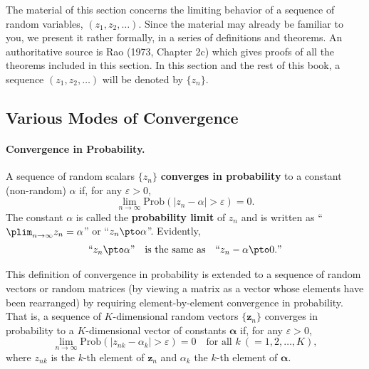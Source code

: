
The material of this section concerns the limiting behavior of a sequence of random
variables, $(z_1, z_2, \ldots)$.  Since the material may already be familiar to you, we
present it rather formally, in a series of definitions and theorems.  An authoritative
source is Rao (1973, Chapter 2c) which gives proofs of all the theorems included
in this section.  In this section and the rest of this book, a sequence $(z_1, z_2, \ldots)$
will be denoted by $\{z_n\}$.

\subsection*{Various Modes of Convergence}

\paragraph{Convergence in Probability.}
A sequence of random scalars $\{z_n\}$ \textbf{converges in probability} to a constant
(non-random) $\alpha$ if, for any $\varepsilon > 0$,
\begin{equation}
  \lim_{n \to \infty} \mathrm{Prob}(|z_n - \alpha| > \varepsilon) = 0.
  \label{eq:2.1.1}
\end{equation}
The constant $\alpha$ is called the \textbf{probability limit} of $z_n$ and is written as
``$\plim_{n \to \infty} z_n = \alpha$'' or ``$z_n \pto \alpha$''.  Evidently,
\[
  \text{``}z_n \pto \alpha\text{''} \quad \text{is the same as} \quad
  \text{``}z_n - \alpha \pto 0.\text{''}
\]

This definition of convergence in probability is extended to a sequence of random
vectors or random matrices (by viewing a matrix as a vector whose elements have
been rearranged) by requiring element-by-element convergence in probability.
That is, a sequence of $K$-dimensional random vectors $\{\mathbf{z}_n\}$ converges in
probability to a $K$-dimensional vector of constants $\bm{\alpha}$ if, for any $\varepsilon > 0$,
\begin{equation}
  \lim_{n \to \infty} \mathrm{Prob}(|z_{nk} - \alpha_k| > \varepsilon) = 0
  \quad \text{for all } k \ (= 1, 2, \ldots, K),
  \label{eq:2.1.2}
\end{equation}
where $z_{nk}$ is the $k$-th element of $\mathbf{z}_n$ and $\alpha_k$ the $k$-th element of $\bm{\alpha}$.

